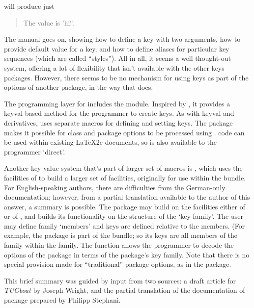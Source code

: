 will produce just
\begin{quote}
  The value is 'hi!'.
\end{quote}
The manual goes on, showing how to define a key with two arguments,
how to provide default value for a key, and how to define aliases for
particular key sequences (which are called ``styles'').  All in all,
it seems a well thought-out system, offering a lot of flexibility that
isn't available with the other keys packages.  However, there seems to
be no mechanism for using  keys as part of the
options of another package, in the way that  does.

The  programming layer for 
includes the  module.  Inspired by ,
it provides a keyval-based method for the programmer to create keys.
As with keyval and derivatives,  uses separate macros
for defining and setting keys.  The package  makes
it possible for \LaTeXe{} class and package
options to be processed using . 
code can be used within existing LaTeX2e documents, so
 is also available to the \LaTeXe{} programmer `direct'.

Another key-value system that's part of larger set of macros is
, which uses the facilities of  to
build a larger set of facilities, originally for use within the
 bundle.  For English-speaking authors, there are
difficulties from the German-only documentation; however, from a
partial translation available to the author of this answer, a summary
is possible.  The package may build on the facilities either of
 or of , and builds its functionality
on the structure of the `key family'.  The user may define family
`members' and keys are defined relative to the members.  (For example,
the package  is part of the 
bundle; so its keys are all members of the 
family within the  family.  The function
 allows the programmer to decode the options
of the package in terms of the package's key family.  Note that there
is no special provision made for ``traditional'' package options, as
in the  package.

This brief summary was guided by input from two sources: a draft article
for \textsl{TUGboat} by Joseph Wright, and the partial translation of the
documentation of package  prepared by Philipp
Stephani.

